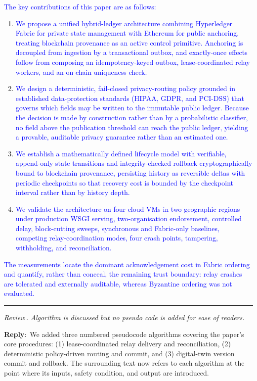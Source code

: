 \documentclass[11pt]{article}
\newcounter{reviewer}
\newcounter{point}[reviewer]
\renewcommand{\thepoint}{Review\,\thereviewer.\arabic{point}}
\newcommand{\point}[1]{\refstepcounter{point}  \bigskip \hrule \medskip \noindent \textit{{\fontseries{b}\selectfont \thepoint } #1}\par}
\newcommand{\reply}{\medskip \noindent \textbf{Reply}:\ }
\begin{document}
\textcolor{blue}{The key contributions of this paper are as follows:}
\begin{enumerate}
\item \textcolor{blue}{We propose a unified hybrid-ledger architecture combining Hyperledger Fabric for private state management with Ethereum for public anchoring, treating blockchain provenance as an active control primitive. Anchoring is decoupled from ingestion by a transactional outbox, and exactly-once effects follow from composing an idempotency-keyed outbox, lease-coordinated relay workers, and an on-chain uniqueness check.}
\item \textcolor{blue}{We design a deterministic, fail-closed privacy-routing policy grounded in established data-protection standards (HIPAA, GDPR, and PCI-DSS) that governs which fields may be written to the immutable public ledger. Because the decision is made by construction rather than by a probabilistic classifier, no field above the publication threshold can reach the public ledger, yielding a provable, auditable privacy guarantee rather than an estimated one.}
\item \textcolor{blue}{We establish a mathematically defined lifecycle model with verifiable, append-only state transitions and integrity-checked rollback cryptographically bound to blockchain provenance, persisting history as reversible deltas with periodic checkpoints so that recovery cost is bounded by the checkpoint interval rather than by history depth.}
\item \textcolor{blue}{We validate the architecture on four cloud VMs in two geographic regions under production WSGI serving, two-organisation endorsement, controlled delay, block-cutting sweeps, synchronous and Fabric-only baselines, competing relay-coordination modes, four crash points, tampering, withholding, and reconciliation.}
\end{enumerate}
\textcolor{blue}{The measurements locate the dominant acknowledgement cost in Fabric ordering and quantify, rather than conceal, the remaining trust boundary: relay crashes are tolerated and externally auditable, whereas Byzantine ordering was not evaluated.}
\medskip

\point{Algorithm is discussed but no pseudo code is added for ease of readers.}

\reply{We added three numbered pseudocode algorithms covering the paper's core
procedures: (1) lease-coordinated relay delivery and reconciliation,
(2) deterministic policy-driven routing and commit, and (3) digital-twin
version commit and rollback. The surrounding text now refers to each algorithm
at the point where its inputs, safety condition, and output are introduced.}
\end{document}

